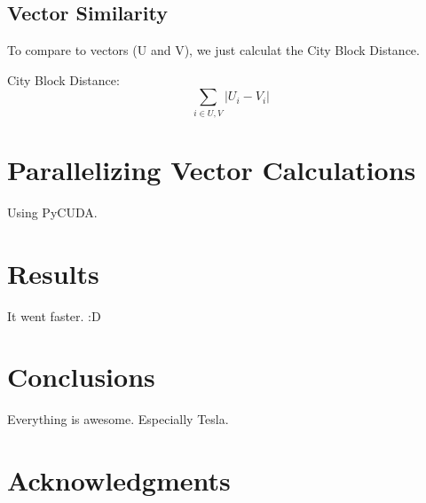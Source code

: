 \documentclass[12pt]{article}
\begin{document}
\subsection{Vector Similarity}

To compare to vectors (U and V), we just calculat the City Block Distance.

City Block Distance:
$$\sum_{i\in U,V} |U_i - V_i| $$

\section{Parallelizing Vector Calculations}

Using PyCUDA. %

\section{Results}

It went faster. :D %


\section{Conclusions}
Everything is awesome. Especially Tesla.

\section{Acknowledgments}



\end{document}
